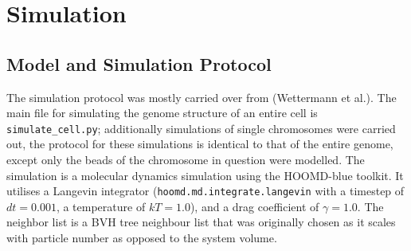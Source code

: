 
\chapter{Simulation} %
\label{cha:simulation}

\section{Model and Simulation Protocol} %
\label{sec:model_and_simulation_protocol}

The simulation protocol was mostly carried over from (Wettermann et al.\cite{wettermann_minimal_2020}). The main file for simulating the genome structure of an entire cell is \verb|simulate_cell.py|; additionally simulations of single chromosomes were carried out, the protocol for these simulations is identical to that of the entire genome, except only the beads of the chromosome in question were modelled. The simulation is a molecular dynamics simulation using the HOOMD-blue\cite{anderson_hoomd-blue_2020} toolkit. It utilises a Langevin integrator (\verb|hoomd.md.integrate.langevin| with a timestep of \(dt=0.001\), a temperature of \(kT = 1.0\)), and a drag coefficient of \(\gamma = 1.0\). The neighbor list is a BVH tree neighbour list \cite{howard_efficient_2016} \cite{howard_quantized_2019} that was originally chosen as it scales
with particle number as opposed to the system volume\cite{wettermann_minimal_2020}.

